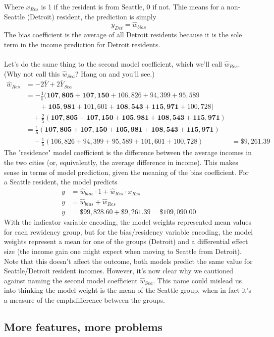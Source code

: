 Where $x_\mathit{Res}$ is 1 if the resident is from Seattle, 0 if not. Thie
means for a non-Seattle (Detroit) resident, the prediction is simply
\begin{equation}
y_\mathit{Det} = \hat{w}_\mathit{bias}
\end{equation}
The bias coefficient is the average of all Detroit residents because it is the
sole term in the income prediction for Detroit residents.\\
\\
Let's do the same thing to the second model coefficient, which we'll call
$\hat{w}_\mathit{Res}$. (Why not call this $\hat{w}_\mathit{Sea}$? Hang on and
you'll see.)
\begin{align}
\hat{w}_\mathit{Res} 
    &= -2 \bar{Y} + 2 \bar{Y}_\mathit{Sea} \\
    &= -\frac{1}{5}(\mathbf{107,805} + \mathbf{107,150} + 106,826 + 94,399 + 95,589 \\
    &\qquad + \mathbf{105,981} + 101,601 + \mathbf{108,543} + \mathbf{115,971} + 100,728)\\
    &\quad + \frac{2}{5}(\mathbf{107,805} + \mathbf{107,150} + \mathbf{105,981} +
                   \mathbf{108,543} + \mathbf{115,971})\\
    &= \frac{1}{5}(\mathbf{107,805} + \mathbf{107,150} + \mathbf{105,981} +
                   \mathbf{108,543} + \mathbf{115,971})\\
    &\quad -\frac{1}{5}(106,826 + 94,399 + 95,589 + 101,601 + 100,728) 
    &= \$9,261.39
\end{align}
The "residence" model coefficient is the difference between the average incomes
in the two cities (or, equivalently, the average difference in income).  This
makes sense in terms of model prediction, given the meaning of the bias
coefficient.  For a Seattle resident, the model predicts
\begin{align}
y &= \hat{w}_\mathit{bias} \cdot 1 + \hat{w}_\mathit{Res} \cdot x_\mathit{Res}\\
y &= \hat{w}_\mathit{bias} + \hat{w}_\mathit{Res}\\
y &= \$99,828.60 + \$9,261.39 = \$109,090.00 
\end{align}
With the indicator variable encoding, the model weights represented mean values
for each rewidency group, but for the bias/residency variable encoding, the
model weights represent a mean for one of the groups (Detroit) and a
differential effect size (the income gain one might expect when moving to
Seattle from Detroit). Note that this doesn't affect the outcome, both models
predict the same value for Seattle/Detroit resident incomes.  However, it's
now clear why we cautioned against naming the second model coefficient
$\hat{w}_\mathit{Sea}$.  This name could mislead us into thinking the model
weight is the mean of the Seattle group, when in fact it's a measure of the
emph{difference} between the groups. \\

\subsection{More features, more problems}








